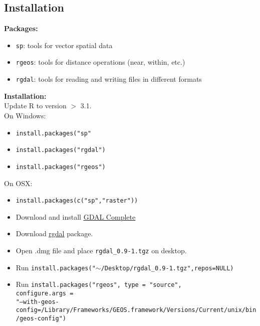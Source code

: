 \documentclass[10pt]{article}
\begin{document}
\subsection*{Installation}
\textbf{Packages:}
\begin{itemize}
	\item \texttt{sp}: tools for vector spatial data
	\item \texttt{rgeos}: tools for distance operations (near, within, etc.)
	\item \texttt{rgdal}: tools for reading and writing files in different formats
\end{itemize}
\textbf{Installation:}\\
Update R to version $>$ 3.1.\\
On Windows:
\begin{itemize}
	\item \texttt{install.packages("sp"}
	\item \texttt{install.packages("rgdal")}
	\item \texttt{install.packages("rgeos")}
\end{itemize}
On OSX:
	\begin{itemize}
		\item \texttt{install.packages(c("sp","raster"))}
		\item Download and install 	\href{http://www.kyngchaos.com/files/software/frameworks/GDAL_Complete-1.11.dmg}{\underline{GDAL Complete}}
		\item Download \href{http://www.kyngchaos.com/files/software/frameworks/rgdal-0.9.1-1.dmg}{\underline{rgdal}} package. 
		\item Open .dmg file and place \texttt{rgdal\_0.9-1.tgz} on desktop.
		\item Run \texttt{install.packages("$\sim$/Desktop/rgdal\_0.9-1.tgz",repos=NULL)}
		\item Run \texttt{install.packages("rgeos", type = "source",} \\
		\texttt{configure.args =} \\
\texttt{"--with-geos-config=/Library/Frameworks/GEOS.framework/Versions/Current/unix/bin/geos-config")}
	\end{itemize}

\hrulefill
\end{document}
